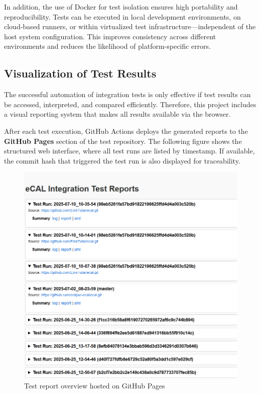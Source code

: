 \vspace{1em}
In addition, the use of Docker for test isolation ensures high portability and reproducibility. Tests can be executed in local development environments, on cloud-based runners, or within virtualized test infrastructure—independent of the host system configuration. This improves consistency across different environments and reduces the likelihood of platform-specific errors.

\clearpage
\subsection{Visualization of Test Results}

The successful automation of integration tests is only effective if test results can be accessed, interpreted, and compared efficiently. Therefore, this project includes a visual reporting system that makes all results available via the browser.

\vspace{0.9em}
After each test execution, GitHub Actions deploys the generated reports to the \textbf{GitHub Pages} section of the test repository. The following figure shows the structured web interface, where all test runs are listed by timestamp. If available, the commit hash that triggered the test run is also displayed for traceability.

\begin{figure}[H]
	\centering
	\includegraphics[width=\textwidth]{Images/github_pages_overview.png}
	\caption{Test report overview hosted on GitHub Pages}
	\label{fig:gh_pages_overview}
\end{figure}


